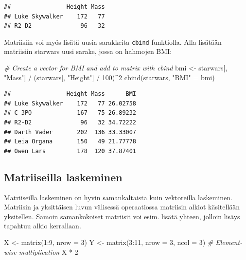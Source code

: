 \documentclass[
]{book}
\newenvironment{Shaded}{\begin{snugshade}}{\end{snugshade}}
\newcommand{\AttributeTok}[1]{\textcolor[rgb]{0.77,0.63,0.00}{#1}}
\newcommand{\CommentTok}[1]{\textcolor[rgb]{0.56,0.35,0.01}{\textit{#1}}}
\newcommand{\DecValTok}[1]{\textcolor[rgb]{0.00,0.00,0.81}{#1}}
\newcommand{\FunctionTok}[1]{\textcolor[rgb]{0.00,0.00,0.00}{#1}}
\newcommand{\NormalTok}[1]{#1}
\newcommand{\OtherTok}[1]{\textcolor[rgb]{0.56,0.35,0.01}{#1}}
\newcommand{\SpecialCharTok}[1]{\textcolor[rgb]{0.00,0.00,0.00}{#1}}
\newcommand{\StringTok}[1]{\textcolor[rgb]{0.31,0.60,0.02}{#1}}
\begin{document}
\begin{verbatim}
##                Height Mass
## Luke Skywalker    172   77
## R2-D2              96   32
\end{verbatim}

Matriisiin voi myös lisätä uusia sarakkeita \texttt{cbind} funktiolla. Alla lisätään matriisiin starwars uusi sarake, jossa on hahmojen BMI:

\begin{Shaded}
\begin{Highlighting}[]
\CommentTok{\# Create a vector for BMI and add to matrix with cbind}
\NormalTok{bmi }\OtherTok{\textless{}{-}}\NormalTok{ starwars[, }\StringTok{"Mass"}\NormalTok{] }\SpecialCharTok{/}\NormalTok{ (starwars[, }\StringTok{"Height"}\NormalTok{] }\SpecialCharTok{/} \DecValTok{100}\NormalTok{)}\SpecialCharTok{\^{}}\DecValTok{2}
\FunctionTok{cbind}\NormalTok{(starwars, }\StringTok{"BMI"} \OtherTok{=}\NormalTok{ bmi)}
\end{Highlighting}
\end{Shaded}

\begin{verbatim}
##                Height Mass      BMI
## Luke Skywalker    172   77 26.02758
## C-3PO             167   75 26.89232
## R2-D2              96   32 34.72222
## Darth Vader       202  136 33.33007
## Leia Organa       150   49 21.77778
## Owen Lars         178  120 37.87401
\end{verbatim}

\hypertarget{matriiseilla-laskeminen}{%
\subsection{Matriiseilla laskeminen}\label{matriiseilla-laskeminen}}

Matriiseilla laskeminen on hyvin samankaltaista kuin vektoreilla laskeminen. Matriisin ja yksittäisen luvun välisessä operaatiossa matriisin alkiot käsitellään yksitellen. Samoin samankokoiset matriisit voi esim. lisätä yhteen, jolloin lisäys tapahtuu alkio kerrallaan.

\begin{Shaded}
\begin{Highlighting}[]
\NormalTok{X }\OtherTok{\textless{}{-}} \FunctionTok{matrix}\NormalTok{(}\DecValTok{1}\SpecialCharTok{:}\DecValTok{9}\NormalTok{, }\AttributeTok{nrow =} \DecValTok{3}\NormalTok{)}
\NormalTok{Y }\OtherTok{\textless{}{-}} \FunctionTok{matrix}\NormalTok{(}\DecValTok{3}\SpecialCharTok{:}\DecValTok{11}\NormalTok{, }\AttributeTok{nrow =} \DecValTok{3}\NormalTok{, }\AttributeTok{ncol =} \DecValTok{3}\NormalTok{)}
\CommentTok{\# Element{-}wise multiplication}
\NormalTok{X }\SpecialCharTok{*} \DecValTok{2}
\end{Highlighting}
\end{Shaded}
\end{document}
